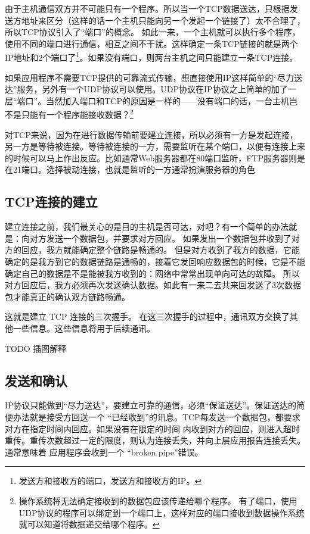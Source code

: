 由于主机通信双方并不可能只有一个程序。所以当一个TCP数据送达，只根据发送方地址来区分（这样的话一个主机只能向另一个发起一个链接了）太不合理了，所以TCP协议引入了“端口”的概念。
如此一来，一个主机就可以执行多个程序，使用不同的端口进行通信，相互之间不干扰。这样确定一条TCP链接的就是两个IP地址和2个端口了\footnote{发送方和接收方的端口，发送方和接收方的IP。}。如果没有端口，则两台主机之间只能建立一条TCP连接。

如果应用程序不需要TCP提供的可靠流式传输，想直接使用IP这样简单的“尽力送达”服务，另外有一个UDP协议可以使用。UDP协议在IP协议之上简单的加了一层“端口”。当然加入端口和TCP的原因是一样的——没有端口的话，一台主机岂不是只能有一个程序能接收数据？\footnote{操作系统将无法确定接收到的数据包应该传递给哪个程序。
有了端口，使用UDP协议的程序可以绑定到一个端口上，这样对应的端口接收到数据操作系统就可以知道将数据递交给哪个程序。}

对TCP来说，因为在进行数据传输前要建立连接，所以必须有一方是发起连接，另一方是等待被连接。等待被连接的一方，需要监听在某个端口，以便有连接上来的时候可以马上作出反应。比如通常Web服务器都在80端口监听，FTP服务器则是在21端口。选择被动连接，也就是监听的一方通常扮演服务器的角色

\subsection{TCP连接的建立}

建立连接之前，我们最关心的是目的主机是否可达，对吧？有一个简单的办法就是：向对方发送一个数据包，并要求对方回应。
如果发出一个数据包并收到了对方的回应，我方就能确定整个链路是畅通的。
但是对方收到了我方的数据，它能确定的是我方到它的数据链路是通畅的，接着它发回响应数据包的时候，它是不能确定自己的数据是不是能被我方收到的：网络中常常出现单向可达的故障。
所以对方回应后，我方必须再次发送确认数据。如此有一来二去共来回发送了3次数据包才能真正的确认双方链路畅通。

这就是建立 TCP 连接的三次握手。
在这三次握手的过程中，通讯双方交换了其他一些信息。这些信息将用于后续通讯。


TODO 插图解释 %


\subsection{发送和确认}
IP协议只能做到“尽力送达”，要建立可靠的通信，必须“保证送达”。保证送达的简便办法就是接受方回送一个
“已经收到”的讯息。TCP每发送一个数据包，都要求对方在指定时间内回应。如果没有在限定的时间
内收到对方的回应，则进入超时重传。重传次数超过一定的限度，则认为连接丢失，并向上层应用报告连接丢失。通常意味着
应用程序会收到一个 “broken pipe”错误。

